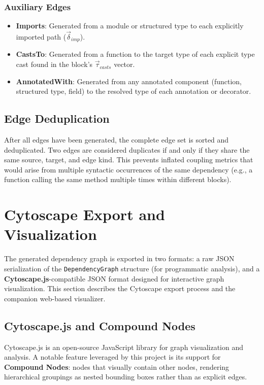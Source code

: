 \subsubsection{Auxiliary Edges}
\begin{itemize}
  \item \textbf{Imports}: Generated from a module or structured type to each explicitly imported path ($\vec{\delta}_{imp}$).
  \item \textbf{CastsTo}: Generated from a function to the target type of each explicit type cast found in the block's $\vec{\tau}_{casts}$ vector.
  \item \textbf{AnnotatedWith}: Generated from any annotated component (function, structured type, field) to the resolved type of each annotation or decorator.
\end{itemize}

\subsection{Edge Deduplication}
After all edges have been generated, the complete edge set is sorted and deduplicated. Two edges are considered duplicates if and only if they share the same source, target, and edge kind. This prevents inflated coupling metrics that would arise from multiple syntactic occurrences of the same dependency (e.g., a function calling the same method multiple times within different blocks).

\section{Cytoscape Export and Visualization}
\label{sec:cytoscape_export}

The generated dependency graph is exported in two formats: a raw JSON serialization of the \texttt{DependencyGraph} structure (for programmatic analysis), and a \textbf{Cytoscape.js}-compatible JSON format \cite{TODO:cytoscape_js} designed for interactive graph visualization. This section describes the Cytoscape export process and the companion web-based visualizer.

\subsection{Cytoscape.js and Compound Nodes}

Cytoscape.js is an open-source JavaScript library for graph visualization and analysis. A notable feature leveraged by this project is its support for \textbf{Compound Nodes}: nodes that visually contain other nodes, rendering hierarchical groupings as nested bounding boxes rather than as explicit edges.

